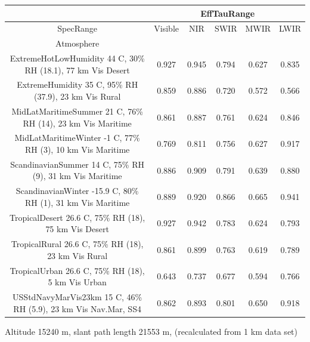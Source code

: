 \documentclass{workpackage}
\begin{document}
\begin{center}

\begin{footnotesize}

\begin{tabular}{|c|c|c|c|c|c|}
\hline
&\multicolumn{5}{|c|}{EffTauRange}\\\hline
SpecRange&Visible&NIR&SWIR&MWIR&LWIR\\\hline
Atmosphere&&&&&\\\hline
ExtremeHotLowHumidity 44 C, 30\% RH (18.1), 77 km Vis Desert&0.927&0.945&0.794&0.627&0.835\\\hline
ExtremeHumidity 35 C, 95\% RH (37.9), 23 km Vis Rural&0.859&0.886&0.720&0.572&0.566\\\hline
MidLatMaritimeSummer 21 C, 76\% RH (14), 23 km Vis Maritime&0.861&0.887&0.761&0.624&0.846\\\hline
MidLatMaritimeWinter -1 C, 77\% RH (3), 10 km Vis Maritime&0.769&0.811&0.756&0.627&0.917\\\hline
ScandinavianSummer 14 C, 75\% RH (9), 31 km Vis Maritime&0.886&0.909&0.791&0.639&0.880\\\hline
ScandinavianWinter -15.9 C, 80\% RH (1), 31 km Vis Maritime&0.889&0.920&0.866&0.665&0.941\\\hline
TropicalDesert 26.6 C, 75\% RH (18), 75 km Vis Desert&0.927&0.942&0.783&0.624&0.793\\\hline
TropicalRural 26.6 C, 75\% RH (18), 23 km Vis Rural&0.861&0.899&0.763&0.619&0.789\\\hline
TropicalUrban 26.6 C, 75\% RH (18), 5 km Vis Urban&0.643&0.737&0.677&0.594&0.766\\\hline
USStdNavyMarVis23km 15 C, 46\% RH (5.9), 23 km Vis Nav.Mar, SS4&0.862&0.893&0.801&0.650&0.918\\\hline

\end{tabular}
\end{footnotesize}
\end{center}



Altitude 15240 m, slant path length 21553 m, (recalculated from 1 km data set)
\end{document}
